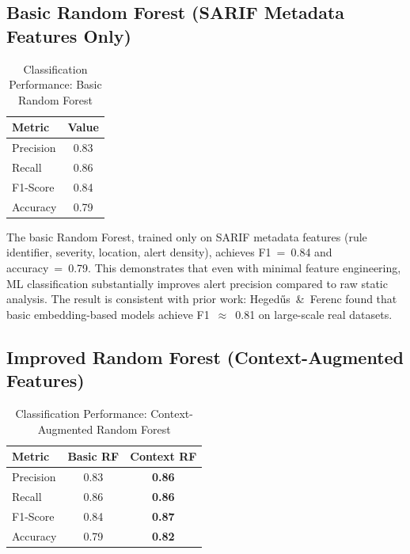 \documentclass[conference]{IEEEtran}
\begin{document}
\subsection{Basic Random Forest (SARIF Metadata Features Only)}

\begin{table}[htbp]
  \centering
  \caption{Classification Performance: Basic Random Forest}
  \label{tab:basic_rf}
  \renewcommand{\arraystretch}{1.2}
  \begin{tabular}{lc}
    \toprule
    \textbf{Metric} & \textbf{Value} \\
    \midrule
    Precision       & 0.83 \\
    Recall          & 0.86 \\
    F1-Score        & 0.84 \\
    Accuracy        & 0.79 \\
    \bottomrule
  \end{tabular}
\end{table}

The basic Random Forest, trained only on SARIF metadata features (rule identifier,
severity, location, alert density), achieves F1~=~0.84 and accuracy~=~0.79. This
demonstrates that even with minimal feature engineering, ML classification
substantially improves alert precision compared to raw static analysis. The result
is consistent with prior work: Heged\H{u}s~\&~Ferenc \cite{hegedus2022sca} found
that basic embedding-based models achieve F1~$\approx$~0.81 on large-scale real
datasets.

\subsection{Improved Random Forest (Context-Augmented Features)}

\begin{table}[htbp]
  \centering
  \caption{Classification Performance: Context-Augmented Random Forest}
  \label{tab:context_rf}
  \renewcommand{\arraystretch}{1.2}
  \begin{tabular}{lcc}
    \toprule
    \textbf{Metric} & \textbf{Basic RF} & \textbf{Context RF} \\
    \midrule
    Precision       & 0.83              & \textbf{0.86} \\
    Recall          & 0.86              & \textbf{0.86} \\
    F1-Score        & 0.84              & \textbf{0.87} \\
    Accuracy        & 0.79              & \textbf{0.82} \\
    \bottomrule
  \end{tabular}
\end{table}
\end{document}
